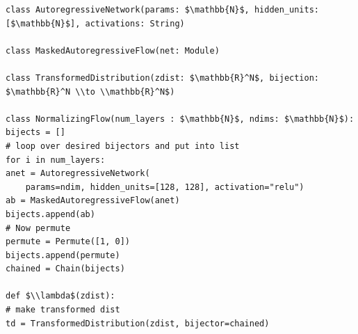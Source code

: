 \documentclass[border=10pt]{standalone}
\begin{document}
\begin{lstlisting}
class AutoregressiveNetwork(params: $\mathbb{N}$, hidden_units: [$\mathbb{N}$], activations: String)

class MaskedAutoregressiveFlow(net: Module)

class TransformedDistribution(zdist: $\mathbb{R}^N$, bijection: $\mathbb{R}^N \\to \\mathbb{R}^N$)

class NormalizingFlow(num_layers : $\mathbb{N}$, ndims: $\mathbb{N}$):
bijects = []
# loop over desired bijectors and put into list
for i in num_layers:
anet = AutoregressiveNetwork(
    params=ndim, hidden_units=[128, 128], activation="relu")
ab = MaskedAutoregressiveFlow(anet)
bijects.append(ab)
# Now permute 
permute = Permute([1, 0])
bijects.append(permute)
chained = Chain(bijects)

def $\\lambda$(zdist):
# make transformed dist
td = TransformedDistribution(zdist, bijector=chained)
\end{lstlisting}
\end{document}
